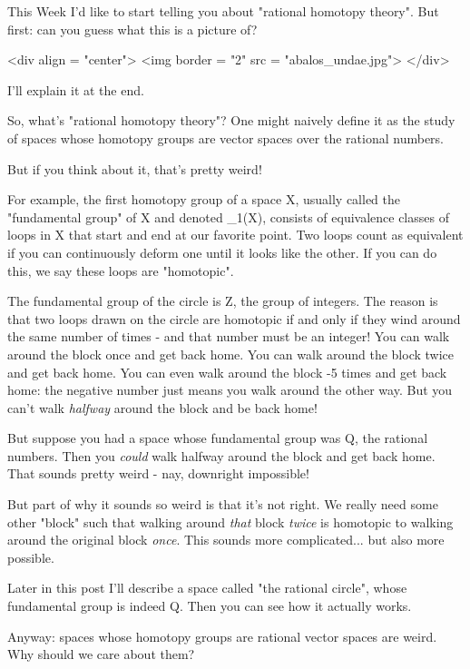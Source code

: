 

This Week I'd like to start telling you about "rational 
homotopy theory".  But first: can you guess what this is a picture
of?  

<div align = "center">
<img border = "2" src = "abalos_undae.jpg">
</div>

I'll explain it at the end.  

So, what's "rational homotopy theory"?  One might naively
define it as the study of spaces whose homotopy groups are vector
spaces over the rational numbers.

But if you think about it, that's pretty weird!  

For example, the first homotopy group of a space X, usually called the
"fundamental group" of X and denoted \pi _{1}(X),
consists of equivalence classes of loops in X that start and end at
our favorite point.  Two loops count as equivalent if you can
continuously deform one until it looks like the other.  If you can do
this, we say these loops are "homotopic".

The fundamental group of the circle is Z, the group of integers.
The reason is that two loops drawn on the circle are homotopic
if and only if they wind around the same number of times - and
that number must be an integer!  You can walk around the block once 
and get back home.  You can walk around the block twice and get back
home.  You can even walk around the block -5 times and get back
home: the negative number just means you walk around the other way.
But you can't walk \emph{halfway} around the block and be back home!

But suppose you had a space whose fundamental group was Q, the
rational numbers.  Then you \emph{could} walk halfway around the
block and get back home.  That sounds pretty weird - nay, downright
impossible!

But part of why it sounds so weird is that it's not right.  We really
need some other "block" such that walking around \emph{that}
block \emph{twice} is homotopic to walking around the original
block \emph{once}.  This sounds more complicated...  but also more
possible.

Later in this post I'll describe a space called "the rational
circle", whose fundamental group is indeed Q.  Then you can see
how it actually works.

Anyway: spaces whose homotopy groups are rational vector spaces are
weird.  Why should we care about them?

